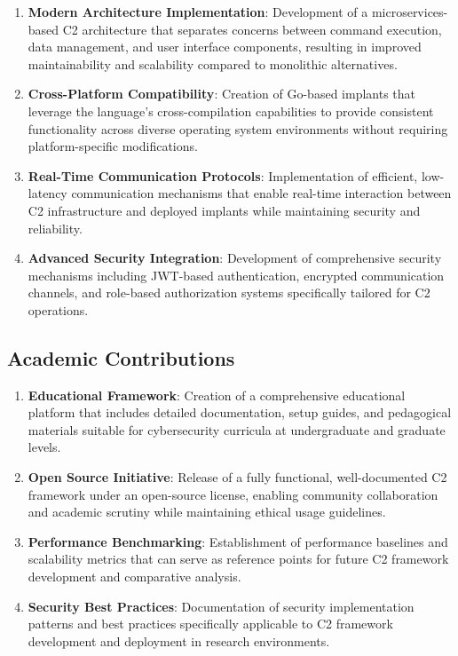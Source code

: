 \begin{enumerate}
\item \textbf{Modern Architecture Implementation}: Development of a microservices-based C2 architecture that separates concerns between command execution, data management, and user interface components, resulting in improved maintainability and scalability compared to monolithic alternatives.

\item \textbf{Cross-Platform Compatibility}: Creation of Go-based implants that leverage the language's cross-compilation capabilities to provide consistent functionality across diverse operating system environments without requiring platform-specific modifications.

\item \textbf{Real-Time Communication Protocols}: Implementation of efficient, low-latency communication mechanisms that enable real-time interaction between C2 infrastructure and deployed implants while maintaining security and reliability.

\item \textbf{Advanced Security Integration}: Development of comprehensive security mechanisms including JWT-based authentication, encrypted communication channels, and role-based authorization systems specifically tailored for C2 operations.
\end{enumerate}

\subsection{Academic Contributions}

\begin{enumerate}
\item \textbf{Educational Framework}: Creation of a comprehensive educational platform that includes detailed documentation, setup guides, and pedagogical materials suitable for cybersecurity curricula at undergraduate and graduate levels.

\item \textbf{Open Source Initiative}: Release of a fully functional, well-documented C2 framework under an open-source license, enabling community collaboration and academic scrutiny while maintaining ethical usage guidelines.

\item \textbf{Performance Benchmarking}: Establishment of performance baselines and scalability metrics that can serve as reference points for future C2 framework development and comparative analysis.

\item \textbf{Security Best Practices}: Documentation of security implementation patterns and best practices specifically applicable to C2 framework development and deployment in research environments.
\end{enumerate}

